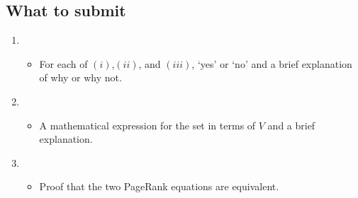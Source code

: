 \subsection*{What to submit}
\begin{enumerate}[2.1:]
\setcounter{enumi}{0}
\item
  \begin{itemize} \item  For each of $(i)$,$(ii)$, and $(iii)$, `yes' or `no' and a brief explanation of why or why not. \end{itemize}
  
\item
  \begin{itemize} \item A mathematical expression for the set in terms of $V$ and a brief explanation. \end{itemize}
  
\item
  \begin{itemize} 
  \item Proof that the two PageRank equations are equivalent.
  \end{itemize}

\end{enumerate}
